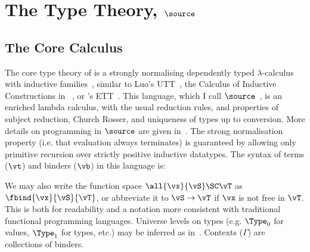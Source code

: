 \section{The Type Theory, $\source$}

\renewcommand{\Vnil}{\DC{vnil}}
\renewcommand{\Vcons}{\DC{vcons}}

\subsection{The Core Calculus}

\label{corett}

The core type theory of \Ivor{} is a strongly normalising dependently
typed $\lambda$-calculus with inductive families~\cite{dybjer94},
similar to Luo's UTT~\cite{luo94}, the Calculus of Inductive
Constructions in \Coq{}~\cite{coq-manual}, or \Epigram{}'s
ETT~\cite{epireloaded}.  This language, which I call
$\source$~\cite{brady-thesis}, is an enriched lambda calculus, with
the usual reduction rules, and properties of subject reduction, Church
Rosser, and uniqueness of types up to conversion. 
More details on programming in $\source$ are given
in~\cite{brady-thesis,dt-framework}.
The strong
normalisation property (i.e. that evaluation always terminates) is
guaranteed by allowing only primitive recursion over strictly positive
inductive datatypes. The syntax of terms ($\vt$) and binders ($\vb$)
in this language is:


We may also write the function space
\mbox{$\all{\vx}{\vS}\SC\vT$} as \mbox{$\fbind{\vx}{\vS}{\vT}$}, or
abbreviate it to \mbox{$\vS\to\vT$} if $\vx$ is not free in
$\vT$. This is both for readability and a notation more consistent
with traditional functional programming languages.
Universe levels on types (e.g. $\Type_0$ for values, $\Type_1$ for
types, etc.) may be inferred as in~\cite{implicit-pollack}.
Contexts ($\Gamma$) are collections of binders.

